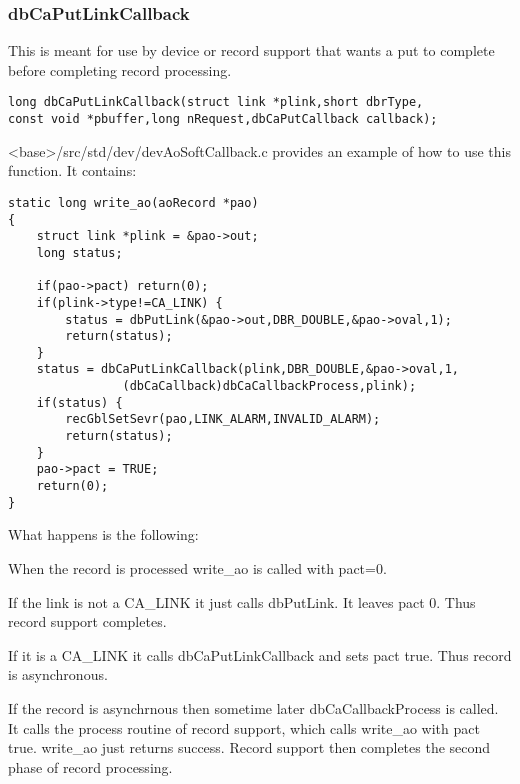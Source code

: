 \subsubsection{dbCaPutLinkCallback}

This is meant for use by device or record support that wants a put to complete before completing record processing.

\begin{verbatim}
long dbCaPutLinkCallback(struct link *plink,short dbrType,
const void *pbuffer,long nRequest,dbCaPutCallback callback);
\end{verbatim}

\textless{}base\textgreater{}/src/std/dev/devAoSoftCallback.c provides an example of how to use this function.
It contains:

\begin{verbatim}
static long write_ao(aoRecord *pao)
{
    struct link *plink = &pao->out;
    long status;

    if(pao->pact) return(0);
    if(plink->type!=CA_LINK) {
        status = dbPutLink(&pao->out,DBR_DOUBLE,&pao->oval,1);
        return(status);
    }
    status = dbCaPutLinkCallback(plink,DBR_DOUBLE,&pao->oval,1,
                (dbCaCallback)dbCaCallbackProcess,plink);
    if(status) {
        recGblSetSevr(pao,LINK_ALARM,INVALID_ALARM);
        return(status);
    }
    pao->pact = TRUE;
    return(0);
}
\end{verbatim}

What happens is the following:

\begin{description}

\item When the record is processed write\_ao is called with pact=0.

\begin{description}

\item If the link is not a CA\_LINK it just calls dbPutLink.
It leaves pact 0.
Thus record support completes.

\item If it is a CA\_LINK it calls dbCaPutLinkCallback and sets pact true.
Thus record is asynchronous.

\end{description}

\item If the record is asynchrnous then sometime later dbCaCallbackProcess is called.
It calls the process routine of record support, which calls write\_ao with pact true.
write\_ao just returns success.
Record support then completes the second phase of record processing.

\end{description}

